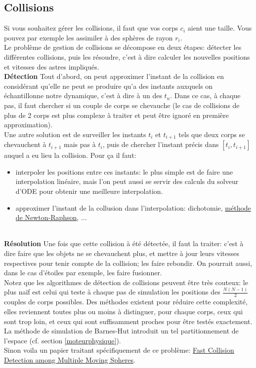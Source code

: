 \documentclass{article}
\begin{document}
\subsection{Collisions}
\label{collisions}

Si vous souhaitez gérer les collisions, il faut que vos corps $c_i$ aient une taille. Vous pouvez par exemple les assimiler à des sphères de rayon $r_i$.\\
Le problème de gestion de collisions se décompose en deux étapes: détecter les différentes collisions, puis les résoudre, c'est à dire calculer les nouvelles positions et vitesses des astres impliqués.\\

\textbf{Détection} Tout d'abord, on peut approximer l'instant de la collision en considérant qu'elle ne peut se produire qu'a des instants auxquels on échantillonne notre dynamique, c'est à dire à un des $t_n$. Dans ce cas, à chaque pas, il faut chercher si un couple de corps se chevauche (le cas de collisions de plus de 2 corps est plus complexe à traiter et peut être ignoré en première approximation). \\
Une autre solution est de surveiller les instants $t_i$ et $t_{i+1}$ tels que deux corps se chevauchent à $t_{i+1}$ mais pas à $t_i$, puis de chercher l'instant précis dans $[t_i, t_{i+1}]$ auquel a eu lieu la collision. Pour ça il faut:
\begin{itemize}
    \item interpoler les positions entre ces instants: le plus simple est de faire une interpolation linéaire, mais l'on peut aussi se servir des calculs du solveur d'ODE pour obtenir une meilleure interpolation.
    \item approximer l'instant de la collusion dans l'interpolation: dichotomie, \href{https://en.wikipedia.org/wiki/Newton\%27s_method}{méthode de Newton-Raphson}, ...
\end{itemize}
~\\

\textbf{Résolution} Une fois que cette collision à été détectée, il faut la traiter: c'est à dire faire que les objets ne se chevauchent plus, et mettre à jour leurs vitesses respectives pour tenir compte de la collision; les faire rebondir. On pourrait aussi, dans le cas d'étoiles par exemple, les faire fusionner. \\

Notez que les algorithmes de détection de collisions peuvent être très couteux: le plus naïf est celui qui teste à chaque pas de simulation les positions des $\frac{N(N-1)}{2}$ couples de corps possibles. Des méthodes existent pour réduire cette complexité, elles reviennent toutes plus ou moins à distinguer, pour chaque corps, ceux qui sont trop loin, et ceux qui sont suffisamment proches pour être testés exactement. La méthode de simulation de Barnes-Hut introduit un tel partitionnement de l'espace (cf. section \ref{moteurphysique}).\\
Sinon voila un papier traitant spécifiquement de ce problème: \href{https://www2.cs.duke.edu/courses/cps124/fall01/resources/p373-kim.pdf}{Fast Collision Detection among Multiple Moving Spheres}.
\end{document}
